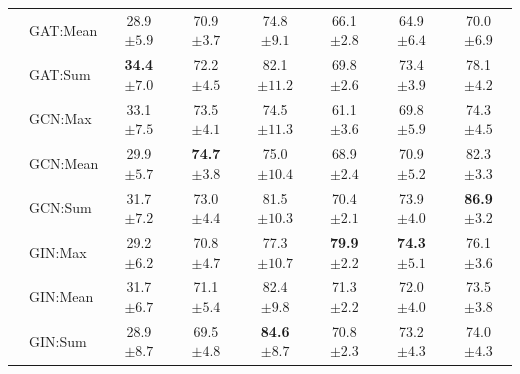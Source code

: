 \begin{table}[!htb]
{\begin{tabular}{@{}c <{\enspace}@{}lcccccc@{}}
			\\ 
			& \textsf{GAT:Mean}    & 28.9 \scriptsize $\pm 5.9$          & 70.9 \scriptsize $\pm 3.7$           & 74.8 \scriptsize $\pm 9.1$            & 66.1 \scriptsize $\pm 2.8$         & 64.9 \scriptsize $\pm 6.4$  & 70.0 \scriptsize $\pm 6.9$
			\\ 
			& \textsf{GAT:Sum}                  & \textbf{34.4} \scriptsize $\pm 7.0$          & 72.2 \scriptsize $\pm 4.5$	            & 82.1 \scriptsize $\pm 11.2$            & 69.8 \scriptsize $\pm 2.6$	          & 73.4 \scriptsize $\pm 3.9$ & 78.1 \scriptsize $\pm 4.2$        
			\\
			\cmidrule{2-8}
			& \textsf{GCN:Max} & 33.1 \scriptsize $\pm 7.5$ &	73.5 \scriptsize $\pm 4.1$	& 74.5 \scriptsize $\pm 11.3$ & 61.1 \scriptsize $\pm 3.6$ &	69.8 \scriptsize $\pm 5.9$ & 74.3 \scriptsize $\pm 4.5$
			\\ 
			& \textsf{GCN:Mean} & 29.9 \scriptsize $\pm 5.7$ &	\textbf{74.7} \scriptsize $\pm 3.8$ & 75.0 \scriptsize $\pm 10.4$ &	68.9 \scriptsize $\pm 2.4$ &	70.9 \scriptsize $\pm 5.2$ & 82.3 \scriptsize $\pm 3.3$
			\\ 
			& \textsf{GCN:Sum} & 31.7 \scriptsize $\pm 7.2$ &	73.0 \scriptsize $\pm 4.4$	& 81.5 \scriptsize $\pm 10.3$ & 70.4 \scriptsize $\pm 2.1$ & 73.9 \scriptsize $\pm 4.0$	& \textbf{86.9} \scriptsize $\pm 3.2$                       
			\\
			\cmidrule{2-8}	
						
			& \textsf{GIN:Max} & 29.2 \scriptsize $\pm 6.2$	& 70.8 \scriptsize $\pm 4.7$ & 77.3 \scriptsize $\pm 10.7$ & \textbf{79.9} \scriptsize $\pm 2.2$ & \textbf{74.3} \scriptsize $\pm 5.1$ & 76.1 \scriptsize $\pm 3.6$  
			\\ 
			& \textsf{GIN:Mean}  & 31.7 \scriptsize $\pm 6.7$	& 71.1 \scriptsize $\pm 5.4$ & 82.4 \scriptsize $\pm 9.8$ & 71.3 \scriptsize $\pm 2.2$	 & 72.0 \scriptsize $\pm 4.0$ & 73.5 \scriptsize $\pm 3.8$
			\\ 
			& \textsf{GIN:Sum} & 28.9 \scriptsize $\pm 8.7$ & 	69.5 \scriptsize $\pm 4.8$	& \textbf{84.6} \scriptsize $\pm 8.7$ & 70.8 \scriptsize $\pm 2.3$ & 73.2 \scriptsize $\pm 4.3$	 & 74.0 \scriptsize $\pm 4.3$
			\\
			\bottomrule
		\end{tabular}}            
\end{table}


